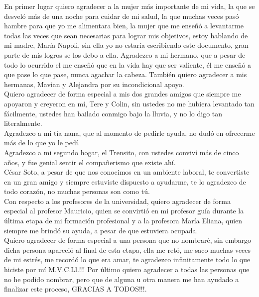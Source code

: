 En primer lugar quiero agradecer a la mujer más importante de mi  vida,  la que se desveló más de una noche  para cuidar de mi salud, la que muchas veces pasó hambre para que yo me alimentara bien, la mujer que me enseñó a levantarme todas las veces que sean necesarias para lograr mis objetivos, estoy hablando de mi madre, María Napoli, sin ella yo no  estaría escribiendo este documento, gran parte de mis logros se los debo a ella. Agradezco a mi hermano,  que a pesar de todo lo ocurrido el me enseñó que en la vida hay que ser valiente, él me enseñó a que pase lo que pase, nunca agachar la cabeza. También quiero agradecer a mis hermanas, Mavian y Alejandra por su incondicional apoyo.
\\

Quiero agradecer de forma especial a mis dos grandes amigos que siempre me apoyaron y creyeron en mí, Tere y Colin, sin ustedes  no me hubiera levantado tan fácilmente, ustedes han  bailado conmigo bajo la lluvia, y no lo digo tan literalmente.\\

Agradezco a mi tía nana, que al momento de pedirle ayuda, no dudó en ofrecerme más de lo que yo le pedí.\\
Agradezco a mi segundo hogar, el Trensito,  con ustedes conviví más de cinco años, y fue genial sentir el compañerismo que existe ahí.
\\

César Soto, a pesar de que nos conocimos en un ambiente laboral, te convertiste en un gran amigo y siempre estuviste dispuesto a ayudarme, te lo agradezco de todo corazón, no muchas personas son como tú.\\


Con respecto a los profesores de la universidad, quiero agradecer de forma especial al profesor Mauricio, quien se convirtió en mi profesor guía durante la última etapa de mi formación profesional y a la profesora María Eliana, quien siempre me brindó su ayuda, a pesar de que estuviera ocupada.\\

Quiero agradecer de forma especial a una persona que no nombraré, sin embargo dicha persona apareció al final de esta etapa, ella me retó, me saco muchas veces de mi estrés, me recordó lo que era amar, te agradezco infinitamente todo lo que hiciste por mí M.V.C.Ll.!!! 
Por último quiero agradecer a todas las personas que no he podido nombrar, pero que de alguna u otra  manera me han ayudado  a finalizar este proceso, GRACIAS A TODOS!!!.


 
 
 
 
 